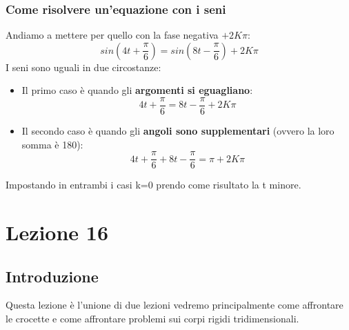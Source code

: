 \documentclass{article}
\numberwithin{equation}{subsection}
\begin{document}
\subsubsection{Come risolvere un'equazione con i seni}
Andiamo a mettere per quello con la fase negativa $+2K\pi$:
\begin{equation}
    sin(4t+\frac{\pi}{6})=sin(8t-\frac{\pi}{6})+2K\pi
\end{equation}
I seni sono uguali in due circostanze:
\begin{itemize}
    \item Il primo caso è quando gli \textbf{argomenti si eguagliano}:
    \begin{equation}
        4t+\frac{\pi}{6}=8t-\frac{\pi}{6}+2K\pi
    \end{equation}
    \item Il secondo caso è quando gli \textbf{angoli sono supplementari} (ovvero la loro somma è 180):
    \begin{equation}
        4t+\frac{\pi}{6}+8t-\frac{\pi}{6}=\pi+2K\pi
    \end{equation}
\end{itemize}
Impostando in entrambi i casi k=0 prendo come risultato la t minore.
\newpage
\section{Lezione 16}
\subsection{Introduzione}
Questa lezione è l'unione di due lezioni vedremo principalmente come affrontare le crocette e come affrontare problemi sui corpi rigidi tridimensionali.
\end{document}
